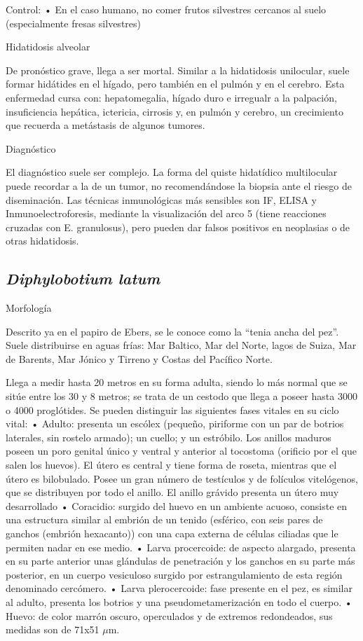 Control:
• En el caso humano, no comer frutos silvestres cercanos al suelo (especialmente fresas silvestres)

Hidatidosis alveolar

De pronóstico grave, llega a ser mortal. Similar a la hidatidosis unilocular, suele formar hidátides en el hígado, pero también en el pulmón y en el cerebro. Esta enfermedad cursa con: hepatomegalia, hígado duro e irregualr a la palpación, insuficiencia hepática, ictericia, cirrosis y, en pulmón y cerebro, un crecimiento que recuerda a metástasis de algunos tumores.


Diagnóstico

El diagnóstico suele ser complejo. La forma del quiste hidatídico multilocular puede recordar a la de un tumor, no recomendándose la biopsia ante el riesgo de diseminación. Las técnicas inmunológicas más sensibles son IF, ELISA y Inmunoelectroforesis, mediante la visualización del arco 5 (tiene reacciones cruzadas con E. granulosus), pero pueden dar falsos positivos en neoplasias o de otras hidatidosis. 
\newpage
\subsection{\textit{Diphylobotium latum}}
Morfología

Descrito ya en el papiro de Ebers, se le conoce como la “tenia ancha del pez”. Suele distribuirse en aguas frías: Mar Baltico, Mar del Norte, lagos de Suiza, Mar de Barents, Mar Jónico y Tirreno y Costas del Pacífico Norte.

Llega a medir hasta 20 metros en su forma adulta, siendo lo más normal que se sitúe entre los 30 y 8 metros; se trata de un cestodo que llega a poseer hasta 3000 o 4000 proglótides. Se pueden distinguir las siguientes fases vitales en su ciclo vital:
• Adulto: presenta un escólex (pequeño, piriforme con un par de botrios laterales, sin rostelo armado); un cuello; y un estróbilo.
Los anillos maduros poseen un poro genital único y ventral y anterior al tocostoma (orificio por el que salen los huevos). El útero es central y tiene forma de roseta, mientras que el útero es bilobulado. Posee un gran número de testículos y de folículos vitelógenos, que se distribuyen por todo el anillo.
El anillo grávido  presenta un útero muy desarrollado 
• Coracidio: surgido del huevo en un ambiente acuoso, consiste en una estructura similar al embrión de un tenido (esférico, con seis pares de ganchos (embrión hexacanto)) con una capa externa de células ciliadas que le permiten nadar en ese medio.
• Larva procercoide: de aspecto alargado, presenta en su parte anterior unas glándulas de penetración y los ganchos en su parte más posterior, en un cuerpo vesiculoso surgido por estrangulamiento de esta región denominado cercómero.
• Larva plerocercoide: fase presente en el pez, es similar al adulto, presenta los botrios y una pseudometamerización en todo el cuerpo.
• Huevo: de color marrón oscuro, operculados y de extremos redondeados, sus medidas son de 71x51 $\mu$m.


